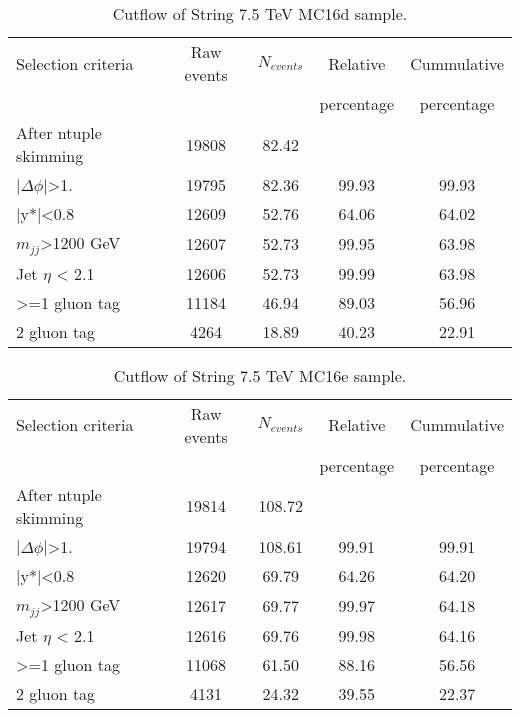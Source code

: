 \begin{table}[ht]
\begin{center}
\begin{tabular}{|l|c|c|c|c|}
\hline
Selection criteria & Raw events & $N_{events}$ & Relative & Cummulative \\
 & & & percentage & percentage \\
\hline
After ntuple skimming & 19808 & 82.42 &  &  \\
$|\Delta\phi|$>1. & 19795 & 82.36 & 99.93 & 99.93 \\
|y*|<0.8 & 12609 & 52.76 & 64.06 & 64.02 \\
$m_{jj}$>1200 GeV & 12607 & 52.73 & 99.95 & 63.98 \\
Jet $\eta$ < 2.1 & 12606 & 52.73 & 99.99 & 63.98 \\
>=1 gluon tag & 11184 & 46.94 & 89.03 & 56.96 \\
2 gluon tag & 4264 & 18.89 & 40.23 & 22.91 \\
\hline
\end{tabular}
\end{center}
\caption{Cutflow of String 7.5 TeV MC16d sample.}
\end{table}

\begin{table}[ht]
\begin{center}
\begin{tabular}{|l|c|c|c|c|}
\hline
Selection criteria & Raw events & $N_{events}$ & Relative & Cummulative \\
 & & & percentage & percentage \\
\hline
After ntuple skimming & 19814 & 108.72 &  &  \\
$|\Delta\phi|$>1. & 19794 & 108.61 & 99.91 & 99.91 \\
|y*|<0.8 & 12620 & 69.79 & 64.26 & 64.20 \\
$m_{jj}$>1200 GeV & 12617 & 69.77 & 99.97 & 64.18 \\
Jet $\eta$ < 2.1 & 12616 & 69.76 & 99.98 & 64.16 \\
>=1 gluon tag & 11068 & 61.50 & 88.16 & 56.56 \\
2 gluon tag & 4131 & 24.32 & 39.55 & 22.37 \\
\hline
\end{tabular}
\end{center}
\caption{Cutflow of String 7.5 TeV MC16e sample.}
\end{table}

